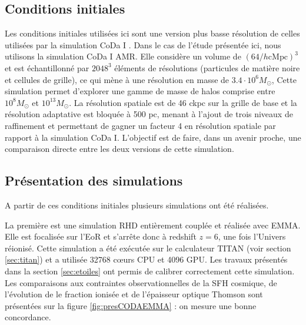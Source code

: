 \subsection{Conditions initiales}
\label{sec:ICCODA}
Les conditions initiales utilisées ici sont une version plus basse résolution de celles utilisées par la simulation CoDa I \citep{ocvirk_cosmic_2015}.
Dans le cas de l'étude présentée ici, nous utilisons la simulation CoDa I AMR.
Elle considère un volume de $\left( 64/h \mathrm{cMpc} \right)^3$ et est échantillonné par $2048^3$ éléments de résolutions (particules de matière noire et cellules de grille), ce qui mène à une résolution en masse de $3.4 \cdot 10^6 M_\odot$,
Cette simulation permet d'explorer une gamme de masse de halos comprise entre $10^8 M_\odot$ et $10^{13}M_\odot$.
La résolution spatiale est de 46 ckpc sur la grille de base et la résolution adaptative est bloquée à 500 pc, menant à l'ajout de trois niveaux de raffinement et permettant de gagner un facteur 4 en résolution spatiale par rapport à la simulation CoDa I.
L'objectif est de faire, dans un avenir proche, une comparaison directe entre les deux versions de cette simulation. %


\subsection{Présentation des simulations}
\label{sec:presCODA}

A partir de ces conditions initiales plusieurs simulations ont été réalisées.

La première est une simulation \ac{RHD} entièrement couplée et réalisée avec EMMA.
Elle est focalisée sur l'\ac{EoR} et s’arrête donc à redshift $z=6$, une fois l'Univers réionisé.
Cette simulation a été exécutée sur le calculateur TITAN (voir section \ref{sec:titan}) et a utilisée 32768 cœurs \ac{CPU} et 4096 \ac{GPU}.
Les travaux présentés dans la section \ref{sec:etoiles} ont permis de calibrer correctement cette simulation.
Les comparaisons aux contraintes observationnelles de la \ac{SFH} cosmique, de l'évolution de le fraction ionisée et de l'épaisseur optique Thomson sont présentées sur la figure \ref{fig:presCODAEMMA} : on mesure une bonne concordance.

